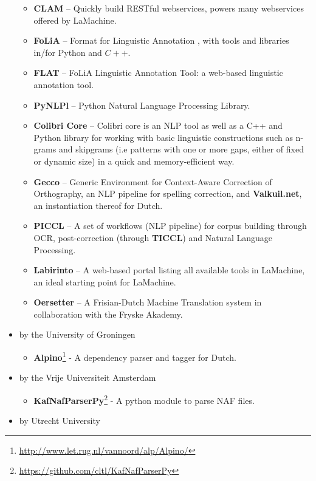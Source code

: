 \documentclass[a4paper,11pt]{article}
\begin{document}
\begin{itemize}
\begin{itemize}
     \item \textbf{CLAM} -- Quickly build RESTful webservices, powers many webservices offered by LaMachine.
     \item \textbf{FoLiA} -- Format for Linguistic Annotation \cite{FOLIAPAPER}, with tools and libraries in/for Python and $C++$.
     \item \textbf{FLAT} -- FoLiA Linguistic Annotation Tool: a web-based linguistic annotation tool.
     \item \textbf{PyNLPl} -- Python Natural Language Processing Library.
     \item \textbf{Colibri Core} -- Colibri core is an NLP tool as well as a C++ and Python library for working with
         basic linguistic constructions such as n-grams and skipgrams (i.e patterns with one or more gaps, either of
         fixed or dynamic size) in a quick and memory-efficient way.
     \item \textbf{Gecco} -- Generic Environment for Context-Aware Correction of Orthography, an NLP pipeline for
         spelling correction,  and \textbf{Valkuil.net}, an instantiation thereof for Dutch.
     \item \textbf{PICCL} -- A set of workflows (NLP pipeline) for corpus building through OCR, post-correction (through \textbf{TICCL}) and Natural Language Processing.
     \item \textbf{Labirinto} -- A web-based portal listing all
         available tools in LaMachine, an ideal starting point for LaMachine.
     \item \textbf{Oersetter} -- A Frisian-Dutch Machine Translation system in collaboration with the Fryske Akademy.
 \end{itemize}
 \item by the University of Groningen
 \begin{itemize}
     \item \textbf{Alpino}\footnote{\url{http://www.let.rug.nl/vannoord/alp/Alpino/}} - A dependency parser and tagger for Dutch.
 \end{itemize}
 \item by the Vrije Universiteit Amsterdam
 \begin{itemize}
     \item \textbf{KafNafParserPy}\footnote{\url{https://github.com/cltl/KafNafParserPy}} - A python module to parse NAF files.
 \end{itemize}
 \item by Utrecht University
 \begin{itemize}

\end{itemize}
\end{itemize}
\end{document}
